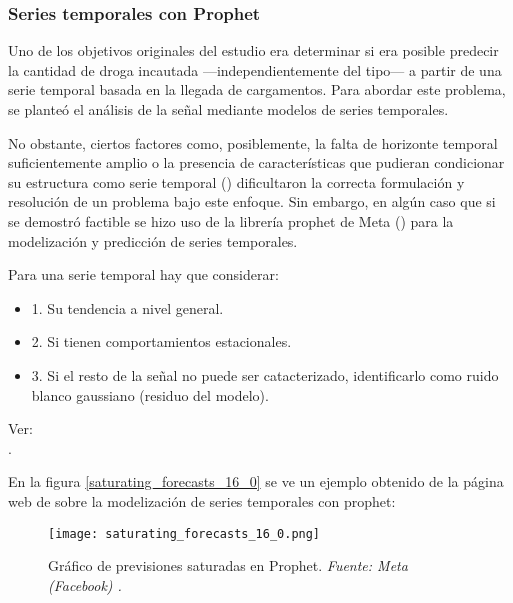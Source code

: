 \documentclass[12pt]{article}
\begin{document}
		\subsubsection{\label{prophet}Series temporales con Prophet}
		Uno de los objetivos originales del estudio era determinar si era posible predecir la cantidad de droga incautada —independientemente del tipo— a partir de una serie temporal basada en la llegada de cargamentos. Para abordar este problema, se planteó el análisis de la señal mediante modelos de series temporales.
		
		No obstante, ciertos factores como, posiblemente, la falta de horizonte temporal suficientemente amplio o la presencia de características que pudieran condicionar su estructura como serie temporal (\cite{towardsdatascience2025timeseries}) dificultaron la correcta formulación y resolución de un problema bajo este enfoque. Sin embargo, en algún caso que si se demostró factible se hizo uso de la librería prophet de Meta (\cite{Taylor2017}) para la modelización y predicción de series temporales.
		
		Para una serie temporal hay que considerar:
		\begin{itemize}
			\item 1. Su tendencia a nivel general.
			\item 2. Si tienen comportamientos estacionales.
			\item 3. Si el resto de la señal no puede ser catacterizado, identificarlo como ruido blanco gaussiano (residuo del modelo).
		\end{itemize}
		Ver: \\
		\cite{towardsdatascience2025timeseries}.
		
		En la figura \ref{saturating_forecasts_16_0} se ve un ejemplo obtenido de la página web de \cite{ProphetSaturatingForecasts} sobre la modelización de series temporales con prophet:
	
		\begin{figure}[H]
			\centering
			\texttt{[image: saturating\_forecasts\_16\_0.png]}
			\hspace*{1cm}
			\caption{Gráfico de previsiones saturadas en Prophet. \textit{Fuente: Meta (Facebook) \cite{ProphetSaturatingForecasts}.}}
			\label{fig:prophet_saturating}
		\end{figure}
		
\end{document}
